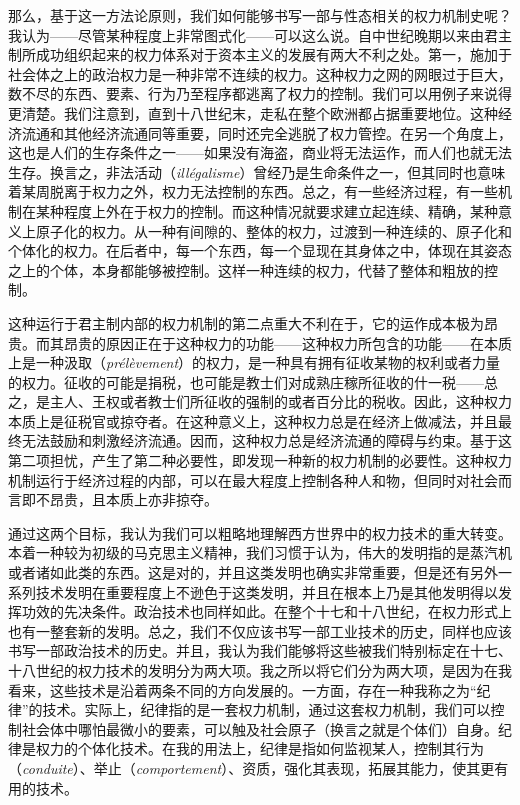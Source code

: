 \documentclass[fontset=fandol, a4paper, 12pt, twoside]{ctexart}
\newcommand{\fr}[1]{\textit{#1}}
\begin{document}
那么，基于这一方法论原则，我们如何能够书写一部与性态相关的权力机制史呢？我认为——尽管某种程度上非常图式化——可以这么说。自中世纪晚期以来由君主制所成功组织起来的权力体系对于资本主义的发展有两大不利之处。第一，施加于社会体之上的政治权力是一种非常不连续的权力。这种权力之网的网眼过于巨大，数不尽的东西、要素、行为乃至程序都逃离了权力的控制。我们可以用例子来说得更清楚。我们注意到，直到十八世纪末，走私在整个欧洲都占据重要地位。这种经济流通和其他经济流通同等重要，同时还完全逃脱了权力管控。在另一个角度上，这也是人们的生存条件之一——如果没有海盗，商业将无法运作，而人们也就无法生存。换言之，非法活动（\fr{illégalisme}）曾经乃是生命条件之一，但其同时也意味着某周脱离于权力之外，权力无法控制的东西。总之，有一些经济过程，有一些机制在某种程度上外在于权力的控制。而这种情况就要求建立起连续、精确，某种意义上原子化的权力。从一种有间隙的、整体的权力，过渡到一种连续的、原子化和个体化的权力。在后者中，每一个东西，每一个显现在其身体之中，体现在其姿态之上的个体，本身都能够被控制。这样一种连续的权力，代替了整体和粗放的控制。

这种运行于君主制内部的权力机制的第二点重大不利在于，它的运作成本极为昂贵。而其昂贵的原因正在于这种权力的功能——这种权力所包含的功能——在本质上是一种汲取（\fr{prélèvement}）的权力，是一种具有拥有征收某物的权利或者力量的权力。征收的可能是捐税，也可能是教士们对成熟庄稼所征收的什一税——总之，是主人、王权或者教士们所征收的强制的或者百分比的税收。因此，这种权力本质上是征税官或掠夺者。在这种意义上，这种权力总是在经济上做减法，并且最终无法鼓励和刺激经济流通。因而，这种权力总是经济流通的障碍与约束。基于这第二项担忧，产生了第二种必要性，即发现一种新的权力机制的必要性。这种权力机制运行于经济过程的内部，可以在最大程度上控制各种人和物，但同时对社会而言即不昂贵，且本质上亦非掠夺。


通过这两个目标，我认为我们可以粗略地理解西方世界中的权力技术的重大转变。本着一种较为初级的马克思主义精神，我们习惯于认为，伟大的发明指的是蒸汽机或者诸如此类的东西。这是对的，并且这类发明也确实非常重要，但是还有另外一系列技术发明在重要程度上不逊色于这类发明，并且在根本上乃是其他发明得以发挥功效的先决条件。政治技术也同样如此。在整个十七和十八世纪，在权力形式上也有一整套新的发明。总之，我们不仅应该书写一部工业技术的历史，同样也应该书写一部政治技术的历史。并且，我认为我们能够将这些被我们特别标定在十七、十八世纪的权力技术的发明分为两大项。我之所以将它们分为两大项，是因为在我看来，这些技术是沿着两条不同的方向发展的。一方面，存在一种我称之为“纪律”的技术。实际上，纪律指的是一套权力机制，通过这套权力机制，我们可以控制社会体中哪怕最微小的要素，可以触及社会原子（换言之就是个体们）自身。纪律是权力的个体化技术。在我的用法上，纪律是指如何监视某人，控制其行为（\fr{conduite}）、举止（\fr{comportement}）、资质，强化其表现，拓展其能力，使其更有用的技术。
\end{document}
